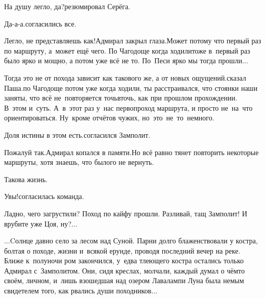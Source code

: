 \diagdash На душу легло, да?\mdash резюмировал Серёга.

\diagdash Да-а-а.\mdash согласились все.

\diagdash Легло, не представляешь как!\mdash Адмирал закрыл глаза.\mdash Может потому что первый раз по маршруту, а~может ещё чего. По Чагодоще когда ходили\mdash тоже в~первый раз было ярко и мощно, а потом уже всё не то. По~Песи ярко мы тогда прошли$\ldots$

\diagdash Тогда это не от похода зависит как такового же, а от новых ощущений.\mdash сказал Паша.\mdash по Чагодоще потом уже когда ходили, ты расстраивался, что стоянки наши заняты, что всё не~повторяется точь\sdash в\sdash точь, как при прошлом прохождении. В~этом и~суть. А~в~этот раз у~нас первопроход маршрута, и просто не~на~что ориентироваться. Ну~кроме отчётов чужих, но~это~не~то~немного.

\diagdash Доля истины в этом есть.\mdash согласился Замполит.

\diagdash Пожалуй так.\mdash Адмирал копался в памяти.\mdash Но всё равно тянет повторить некоторые маршруты, хотя знаешь, что былого не вернуть.

\diagdash Такова жизнь.

\diagdash Увы!\mdash согласилась команда.

\diagdash Ладно, чего загрустили? Поход по кайфу прошли. Разливай, тащ Замполит! И врубите уже Цоя, ну?$\ldots$

\vspace{1em}
$\ldots$Cолнце давно село за лесом над Суной. Парни долго блаженствовали у костра, болтая о походе, жизни и~всякой ерунде, проводя последний вечер на реке. Ближе к~полуночи ром закончился, у~едва тлеющего костра остались только Адмирал с~Замполитом. Они, сидя креслах, молчали, каждый думал о чём\sdash то своём, личном, и~лишь взошедшая над озером Лавалампи Луна была немым свидетелем того, как рвались души походников$\ldots$


\begin{center}
\end{center}
